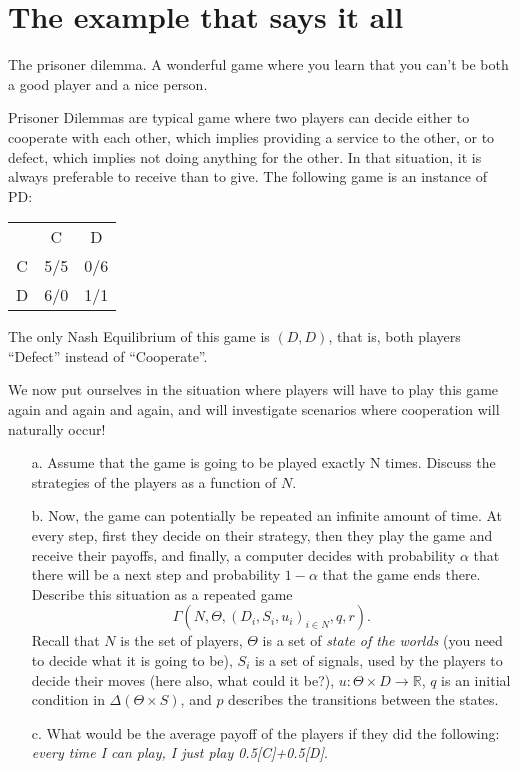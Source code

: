 \documentclass{../ape}
\newcommand{\reels}{\mathbb{R}}
\begin{document}

\section{The example that says it all}
The prisoner dilemma. A wonderful game where you learn that you can't be both a good player and a nice person.

Prisoner Dilemmas are typical game where two players can decide either to cooperate with each other, which implies providing a service to the other, or to defect, which implies not doing anything for the other. In that situation, it is always preferable to receive than to give. The following game is an instance of PD:
\begin{center}
\begin{tabular}{c|cc}
& C & D \\
C & 5/5 & 0/6 \\
D & 6/0 & 1/1
\end{tabular}
\end{center}
The only Nash Equilibrium of this game is $(D,D)$, that is, both players ``Defect'' instead of ``Cooperate''.

We now put ourselves in the situation where players will have to play this game again and again and again, and will investigate scenarios where cooperation will naturally occur!
\begin{enumerate}
	\item[a.] Assume that the game is going to be played exactly N times. Discuss the strategies of the players as a function of $N$. 
	\item[b.] Now, the game can potentially be repeated an infinite amount of time. At every step, first they decide on their strategy, then they play the game and receive their payoffs, and finally, a computer decides with probability $\alpha$ that there will be a next step and probability $1-\alpha$ that the game ends there.\\
	Describe this situation as a repeated game $$\Gamma(N, \Theta, (D_i, S_i, u_i)_{i \in N}, q, r).$$
	Recall that $N$ is the set of players, $\Theta$ is a set of \emph{state of the worlds} (you need to decide what it is going to be), $S_i$ is a set of signals, used by the players to decide their moves (here also, what could it be?), $u : \Theta \times D \rightarrow \reels$, $q$ is an initial condition in $\Delta( \Theta \times S)$, and $p$ describes the transitions between the states.
		\item[c.] What would be the average payoff of the players if they did the following:
		\emph{every time I can play, I just play 0.5[C]+0.5[D]}. 
\end{enumerate}
\end{document}
